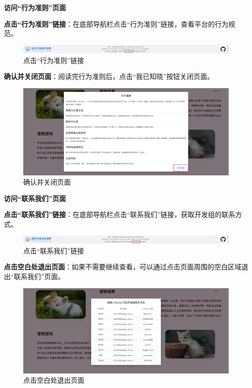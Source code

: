 \begin{itemize}
	\textbf{访问“行为准则”页面}

	\textbf{点击“行为准则”链接}：在底部导航栏点击“行为准则”链接，查看平台的行为规范。

	\begin{figure}[H]
		\centering
		\includegraphics[scale=0.8]{figures/FooterNavigationBar8.png} 
		\caption{点击“行为准则”链接}
	\end{figure}

	\textbf{确认并关闭页面}：阅读完行为准则后，点击“我已知晓”按钮关闭页面。

	\begin{figure}[H]
		\centering
		\includegraphics[scale=0.8]{figures/FooterNavigationBar9.png} 
		\caption{确认并关闭页面}
	\end{figure}

	\textbf{访问“联系我们”页面}

	\textbf{点击“联系我们”链接}：在底部导航栏点击“联系我们”链接，获取开发组的联系方式。

	\begin{figure}[H]
		\centering
		\includegraphics[scale=0.8]{figures/FooterNavigationBar10.png} 
		\caption{点击“联系我们”链接}
	\end{figure}

	\textbf{点击空白处退出页面}：如果不需要继续查看，可以通过点击页面周围的空白区域退出“联系我们”页面。

	\begin{figure}[H]
		\centering
		\includegraphics[scale=0.8]{figures/FooterNavigationBar11.png} 
		\caption{点击空白处退出页面}
	\end{figure}


\end{itemize}
